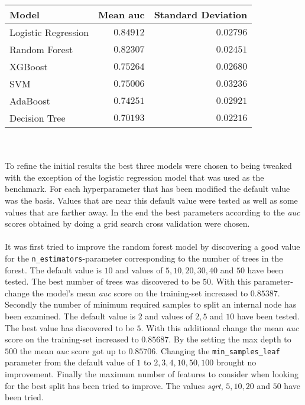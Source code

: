 \documentclass[11pt]{article}
\begin{document}
\begin{center}
    \begin{tabular}{l|r|r}
        {\bf Model} & {\bf Mean auc} & {\bf Standard Deviation} \\ \hline 
        Logistic Regression & $0.84912$ & $0.02796$ \\
        Random Forest & $0.82307$ & $0.02451$ \\
        XGBoost & $0.75264$ & $0.02680$ \\
        SVM & $0.75006$ & $0.03236$ \\
        AdaBoost & $0.74251$ & $0.02921$ \\
        Decision Tree & $0.70193$ & $0.02216$ \\
    \end{tabular}
\end{center}
\noindent
\\ \\
To refine the initial results the best three models were chosen to being tweaked
with the exception of the logistic regression model that was used as the benchmark.
For each hyperparameter that has been modified the default value was the basis. 
Values that are near this default value were tested as well as some values
that are farther away. In the end the best parameters according to the 
{\it auc} scores obtained by doing a grid search cross validation were chosen.
\\ \\
It was first tried to improve the random forest model
by discovering a good value for the {\tt n\_estimators}-parameter
corresponding to the number of trees in the forest. The
default value is $10$ and values of $5, 10, 20, 30, 40$ and $50$ have been tested.
The best number of trees was discovered to be $50$. With this parameter-change
the model's mean {\it auc} score on the training-set increased to $0.85387$.
Secondly the number of minimum required samples to split an internal node has been
examined. The default value is $2$ and values of $2, 5$ and $10$ have been tested.
The best value has discovered to be $5$. With this additional change the
mean {\it auc} score on the training-set increased to $0.85687$. By the setting the
max depth to $500$ the mean {\it auc} score got up to $0.85706$. Changing
the {\tt min\_samples\_leaf} parameter from the default
value of $1$ to $2, 3, 4, 10, 50, 100$ brought no improvement. Finally the 
maximum number of features to consider when looking for the best split has been
tried to improve. The values {\it sqrt}, $5, 10, 20$ and $50$ have been tried.
\end{document}
